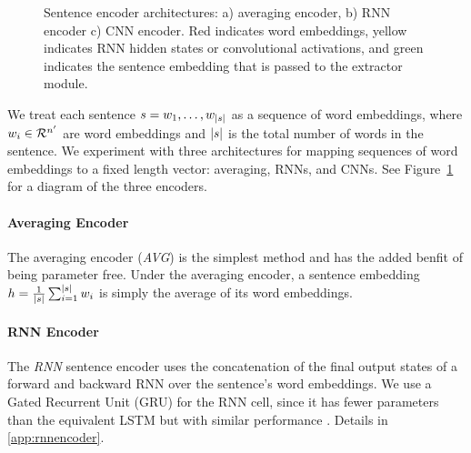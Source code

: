 \begin{figure}
  \caption{Sentence encoder architectures: a) averaging encoder, b) RNN encoder
           c) CNN encoder. Red indicates word embeddings, yellow indicates
           RNN hidden states or convolutional activations, and green 
           indicates the sentence embedding that is passed to the extractor
           module.}
    \label{fig:encoders}
\end{figure}


We treat each sentence $\sent = \wordEmb[1], \ldots, \wordEmb[\sentSize]$
as a sequence of word embeddings, where 
$\wordEmb[i] \in \mathcal{R}^\wordEmbSize$ are word embeddings and
$\sentSize$ is the total number of words
in the sentence. We experiment with three architectures for mapping sequences
of word embeddings to a fixed length vector: averaging, RNNs, and CNNs.
See Figure~\ref{fig:encoders} for a diagram of the three encoders.

\paragraph{Averaging Encoder} The averaging encoder (\textit{AVG}) is the simplest
method and has the added benfit of being parameter free. 
Under the averaging encoder, a sentence embedding 
$\sentEmb = \frac{1}{\sentSize} \sum_{i=1}^{\sentSize} \wordEmb[i]$  
is simply the average of its word embeddings. 
%

\paragraph{RNN Encoder} The \textit{RNN} sentence encoder uses the 
concatenation 
of the
final output states of a forward and backward RNN over the sentence's word
embeddings. We use a Gated Recurrent Unit (GRU)  
for the RNN cell,
since it has fewer parameters than the equivalent LSTM but with similar 
performance \cite{chung2014empirical}. Details in \autoref{app:rnnencoder}.

